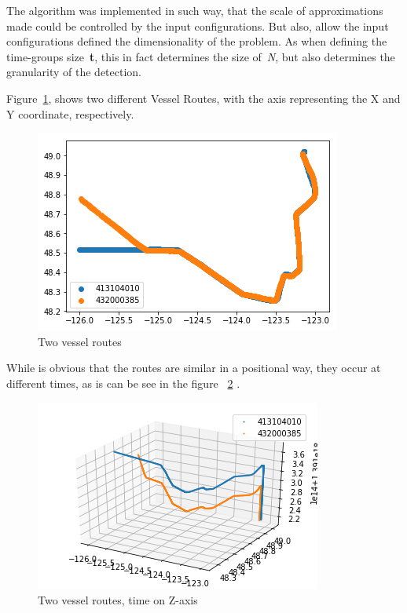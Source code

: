 The algorithm was implemented in such way, that the scale of approximations made could be controlled by the input configurations. But also, allow the input configurations defined the dimensionality of the problem. As when defining the time-groups size~\textbf{t}, this in fact determines the size of~\emph{N}, but also determines the granularity of the detection.

Figure~\ref{fig: VesselRendevouz2d}, shows two different Vessel Routes, with the axis representing the X and Y coordinate, respectively.

\begin{figure}[H]
\centering
\includegraphics[scale = .8]{figures/VesselRendevouz2d}
\caption{Two vessel routes}
\label{fig: VesselRendevouz2d}
\end{figure}

While is obvious that the routes are similar in a positional way, they occur at different times, as is can be see in the figure ~\ref{fig: VesselRendevouz3d} .

\begin{figure}[H]
\centering
\includegraphics[scale = .9]{figures/VesselRendevouz3d}
\caption{Two vessel routes, time on Z-axis}
\label{fig: VesselRendevouz3d}
\end{figure}

